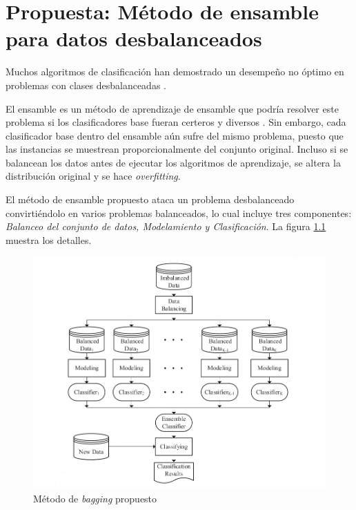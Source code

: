 \chapter{Propuesta: Método de ensamble para datos desbalanceados}




Muchos algoritmos de clasificación han demostrado un desempeño no óptimo en problemas con clases desbalanceadas \citep{batista2004study, mani2003knn, seiffert2010rusboost}.

El ensamble es un método de aprendizaje de ensamble que podría resolver este problema si los clasificadores base fueran certeros y diversos \citep{breiman1996bagging}. Sin embargo, cada clasificador base dentro del ensamble aún sufre del mismo problema, puesto que las instancias se muestrean proporcionalmente del conjunto original. Incluso si se balancean los datos antes de ejecutar los algoritmos de aprendizaje, se altera la distribución original y se hace \textit{overfitting}.

El método de ensamble propuesto \citep{sun2015novel} ataca un problema desbalanceado convirtiéndolo en varios problemas balanceados, lo cual incluye tres componentes: \textit{Balanceo del conjunto de datos, Modelamiento y Clasificación}. La figura \ref{fig:bagging-imbalanced} muestra los detalles.

\begin{figure}
	\centering
	\includegraphics[width=\linewidth]{graficos/bagging_imbalanced.png}
	\caption{Método de \textit{bagging} propuesto \citep{sun2015novel}}
	\label{fig:bagging-imbalanced}
\end{figure}


